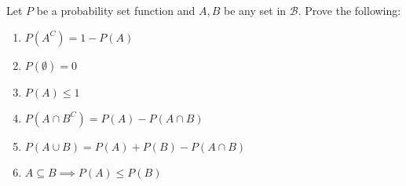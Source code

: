\documentclass[notoc,notitlepage]{tufte-book}
\begin{document}
\begin{propo}\label{propo:properties_of_probability_set_functions}
  Let $P$ be a probability set function and $A, B$ be any set in $\mathscr{B}$. Prove the following:
  \begin{enumerate}
    \item $P(A^C) = 1 - P(A)$
    \item $P(\emptyset) = 0$
    \item $P(A) \leq 1$
    \item $P(A \cap B^C) = P(A) - P(A \cap B)$
    \item $P(A \cup B) = P(A) + P(B) - P(A \cap B)$
    \item $A \subseteq B \implies P(A) \leq P(B)$
  \end{enumerate}
\end{propo}
\end{document}

